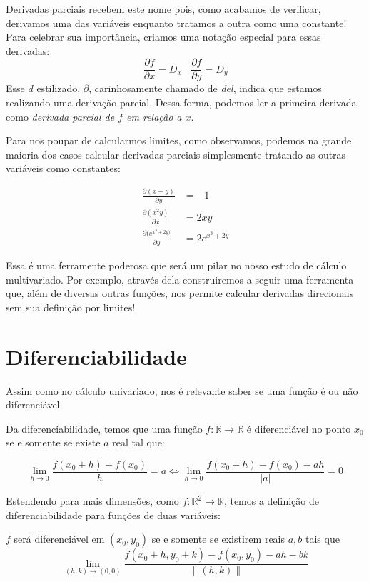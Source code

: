 \documentclass[
  letterpaper,
  DIV=11,
  numbers=noendperiod]{scrreprt}
\begin{document}
Derivadas parciais recebem este nome pois, como acabamos de verificar,
derivamos uma das variáveis enquanto tratamos a outra como uma
constante! Para celebrar sua importância, criamos uma notação especial
para essas derivadas: \[
\frac{\partial f}{\partial x} = D_x ~~~~ \frac{\partial f}{\partial y} = D_y
\] Esse \(d\) estilizado, \(\partial\), carinhosamente chamado de
\emph{del}, indica que estamos realizando uma derivação parcial. Dessa
forma, podemos ler a primeira derivada como \emph{derivada parcial de
\(f\) em relação a \(x\)}.

Para nos poupar de calcularmos limites, como observamos, podemos na
grande maioria dos casos calcular derivadas parciais simplesmente
tratando as outras variáveis como constantes:

\[
\begin{aligned}
\frac{\partial (x - y)}{\partial y} &= -1 \\
\frac{\partial (x^2y)}{\partial x } &= 2xy \\
\frac{\partial (e^{x^3+2y)}}{\partial y} &= 2 e^{x^3 + 2y} 
\end{aligned}
\]

Essa é uma ferramente poderosa que será um pilar no nosso estudo de
cálculo multivariado. Por exemplo, através dela construiremos a seguir
uma ferramenta que, além de diversas outras funções, nos permite
calcular derivadas direcionais sem sua definição por limites!

\section{Diferenciabilidade}\label{diferenciabilidade}

Assim como no cálculo univariado, nos é relevante saber se uma função é
ou não diferenciável.

Da diferenciabilidade, temos que uma função
\(f: \mathbb{R} \rightarrow \mathbb{R}\) é diferenciável no ponto
\(x_0\) se e somente se existe \(a\) real tal que:

\[
\lim_{h\rightarrow 0 } \frac{f(x_0+h)-f(x_0)}{h} = a \Leftrightarrow 
\lim_{h\rightarrow 0 } \frac{f(x_0+h) - f(x_0) - ah}{\lvert a \rvert} = 0
\]

Estendendo para mais dimensões, como
\(f: \mathbb{R}^2 \rightarrow \mathbb{R}\), temos a definição de
diferenciabilidade para funções de duas variáveis:

\(f\) será diferenciável em \((x_0,y_0)\) se e somente se existirem
reais \(a, b\) tais que \[
\lim_{(h,k) \rightarrow (0,0)} \frac{f(x_0+h, y_0+k) - f(x_0,y_0) -ah -bk}{\lVert (h,k) \rVert}
\]
\end{document}
